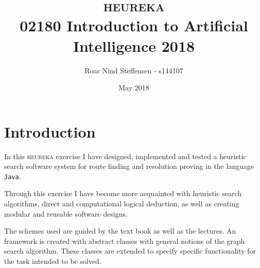 \documentclass{article}
\title{\Huge{\textsc{heureka}}\\ \LARGE{02180 Introduction to Artificial Intelligence 2018}}
\author{Roar Nind Steffensen - s144107}
\date{May 2018}
\begin{document}
\maketitle

\tableofcontents

\vspace{2cm}

\section{Introduction}
In this \textsc{heureka} exercise I have designed, implemented and tested a heuristic search software system for route finding and resolution proving in the language \texttt{Java}.

Through this exercise I have become more acquainted with heuristic search algorithms, direct and computational logical deduction, as well as creating modular and reusable software designs.

The schemes used are guided by the text book \cite{ai_text_book} as well as the lectures. An framework is created with abstract classes with general notions of the graph search algorithm. These classes are extended to specify specific functionality for the task intended to be solved.

\pagebreak




\vfill
\printbibliography
\end{document}
